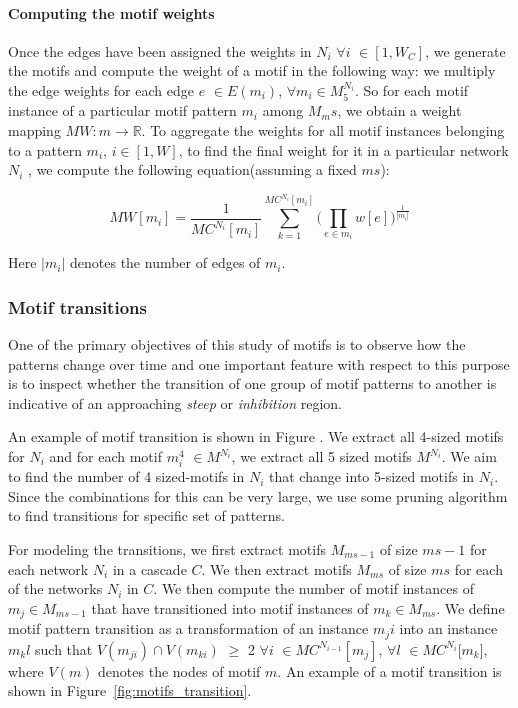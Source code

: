 \documentclass[smallextended]{svjour3}       %
\theoremstyle{definition}
\begin{document}
\paragraph{Computing the motif weights}
Once the edges have been assigned the weights in $N_i$ $\forall i$ $\in [1, W_C]$, we generate the motifs and compute the weight of a motif in the following way: we multiply the edge weights for each edge $e$ $\in E(m_i)$, $\forall m_i \in M_5^{N_i}$. So for each motif instance of a particular motif pattern $m_i$ among $M_ms$, we obtain a weight mapping $MW:m \rightarrow \mathbb{R}$. To aggregate the weights for all motif instances belonging to a pattern $m_i$, $i \in [1, W]$, to find the final weight for it in a particular network $N_i$ , we compute the following equation(assuming a fixed $ms$): 

\begin{equation}
MW[m_i] = \frac{1}{MC^{N_i}[m_i]} \sum_{k=1}^{MC^{N_i}[m_i]} \big( \prod_{e \in m_i} w[e] \big)^{\frac{1}{|m_i|}}
\end{equation}
 
 Here $|m_i|$ denotes the number of edges of $m_i$.


\subsubsection{Motif transitions}
One of the primary objectives of this study of motifs is to observe how the patterns change over time and one important feature with respect to this purpose is to inspect whether the transition of one group of motif patterns to another is indicative of an approaching \textit{steep} or \textit{inhibition} region.

An example of motif transition is shown in Figure . We extract all 4-sized motifs for $N_i$ and for each motif $m^4_i$ $\in M^{N_i} $, we extract all 5 sized motifs $M^{N_i} $. We aim to find the number of 4 sized-motifs in $N_i$ that change into 5-sized motifs in $N_i$. Since the combinations for this can be very large, we use some pruning algorithm to find transitions for specific set of patterns.

For modeling the transitions, we first extract motifs $M_{ms-1}$ of size $ms-1$ for each network $N_i$ in a cascade $C$. We then extract motifs $M_{ms}$ of size $ms$ for each of the networks $N_i$ in $C$. We then compute the number of motif instances of $m_j \in M_{ms-1}$
that have transitioned into motif instances of $m_k \in M_{ms}$. We define motif pattern transition as a transformation of an instance $m_ji $ into an instance $m_kl$ such that $V(m_{ji}) \cap V(m_{ki})$ $\geq $ 2 $\forall i $ $\in MC^{N_{i-1}}[m_j]$, $\forall l $ $\in MC^{N_i}[m_k$], where $V(m)$ denotes the nodes of motif $m$. An example of a motif transition is shown in Figure~\ref{fig:motifs_transition}. 
\end{document}
